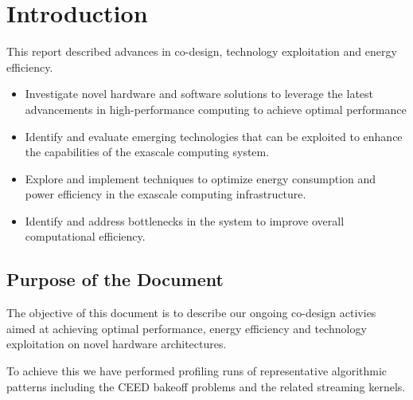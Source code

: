 \documentclass[a4paper,12pt]{article}
\begin{document}
\vspace*{2cm}

\disclaimer

\newpage

\tableofcontents %

\newpage

\section{{Introduction}}

This report described advances in co-design, technology exploitation and energy efficiency.

\begin{itemize}
    \item Investigate novel hardware and software solutions to leverage the latest advancements in high-performance computing
to achieve optimal performance
    \item Identify and evaluate emerging technologies that can be exploited to enhance the capabilities of the exascale computing
system.
    \item Explore and implement techniques to optimize energy consumption and power efficiency in the exascale computing
infrastructure.
    \item Identify and address bottlenecks in the system to improve overall computational efficiency.
\end{itemize}

\subsection{{Purpose of the Document}}

The objective of this document is to describe our ongoing co-design activies
aimed at achieving optimal performance, energy efficiency and technology exploitation
on novel hardware architectures. 

To achieve this we have performed profiling runs
of representative algorithmic patterns including the CEED bakeoff problems and
the related streaming kernels.
\end{document}
